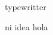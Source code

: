 \documentclass[12pt,letterpaper]{book}
\begin{document}
    {\ttfamily typewritter}
    
    {\sffamily ni idea}
    hola
    
\end{document}
